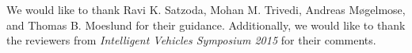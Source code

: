 We would like to thank Ravi K. Satzoda, Mohan M. Trivedi, Andreas Møgelmose, and Thomas B. Moeslund for their guidance. Additionally, we would like to thank the reviewers from \textit{Intelligent Vehicles Symposium 2015} for their comments.